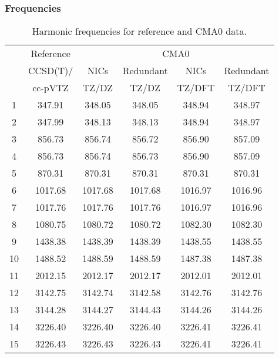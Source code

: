 \documentclass[10pt,oneside]{article}
\begin{document}
\begin{table}[h!]
\subsubsection*{Frequencies}
\centering
\caption{Harmonic frequencies for reference and CMA0 data.}
\begin{tabular}{cccccc}
\toprule
{} & Reference & \multicolumn{4}{c}{CMA0} \\
{} &  CCSD(T)/ &    NICs &  Redundant &    NICs & Redundant \\
{} &   cc-pVTZ &   TZ/DZ &      TZ/DZ &  TZ/DFT &    TZ/DFT \\
\midrule
1  &    347.91 &  348.05 &     348.05 &  348.94 &    348.97 \\
2  &    347.99 &  348.13 &     348.13 &  348.94 &    348.97 \\
3  &    856.73 &  856.74 &     856.72 &  856.90 &    857.09 \\
4  &    856.73 &  856.74 &     856.73 &  856.90 &    857.09 \\
5  &    870.31 &  870.31 &     870.31 &  870.31 &    870.31 \\
6  &   1017.68 & 1017.68 &    1017.68 & 1016.97 &   1016.96 \\
7  &   1017.76 & 1017.76 &    1017.76 & 1016.97 &   1016.96 \\
8  &   1080.75 & 1080.72 &    1080.72 & 1082.30 &   1082.30 \\
9  &   1438.38 & 1438.39 &    1438.39 & 1438.55 &   1438.55 \\
10 &   1488.52 & 1488.59 &    1488.59 & 1487.38 &   1487.38 \\
11 &   2012.15 & 2012.17 &    2012.17 & 2012.01 &   2012.01 \\
12 &   3142.75 & 3142.74 &    3142.58 & 3142.76 &   3142.76 \\
13 &   3144.28 & 3144.27 &    3144.43 & 3144.26 &   3144.26 \\
14 &   3226.40 & 3226.40 &    3226.40 & 3226.41 &   3226.41 \\
15 &   3226.43 & 3226.43 &    3226.43 & 3226.41 &   3226.41 \\
\bottomrule
\end{tabular}
\end{table}
\end{document}
